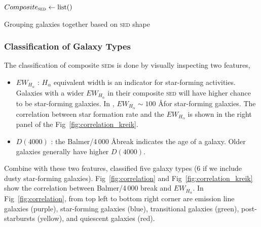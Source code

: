 \documentclass{ar-1col}
\begin{document}
\begin{algorithm}
    $Composite_\textsc{sed} \leftarrow \mathrm{list}()$


    \caption{Grouping galaxies together based on \textsc{sed} shape}
    \label{algorithm:grouping}
\end{algorithm}



\subsubsection{Classification of Galaxy Types}

The classification of composite \textsc{sed}s is done by visually inspecting two features,

\begin{itemize}
    \item $EW_{H_\alpha}$ : $H_\alpha$ equivalent width is an indicator for star-forming activities. Galaxies with a wider $EW_{H_\alpha}$ in their composite \textsc{sed} will have higher chance to be star-forming galaxies. In \citet{Forrest2018}, $EW_{H_\alpha} \sim 100$ \AA for star-forming galaxies. The correlation between star formation rate and the $EW_{H_\alpha}$ is shown in the right panel of the Fig~\ref{fig:correlation_kreik}.
    \item $D(4000)$ : the Balmer/4\,000 \AA  break indicates the age of a galaxy. Older galaxies generally have higher $D(4000)$. 
\end{itemize}

Combine with these two features, \citet{Forrest2018} classified five galaxy types (6 if we include dusty star-forming galaxies).
Fig~\ref{fig:correlation} and Fig~\ref{fig:correlation_kreik} show the correlation between Balmer/4\,000 break and $EW_{H_\alpha}$.
In Fig~\ref{fig:correlation}, from top left to bottom right corner are emission line galaxies (purple), star-forming galaxies (blue), transitional galaxies (green), post-starbursts (yellow), and quiescent galaxies (red).
\end{document}
